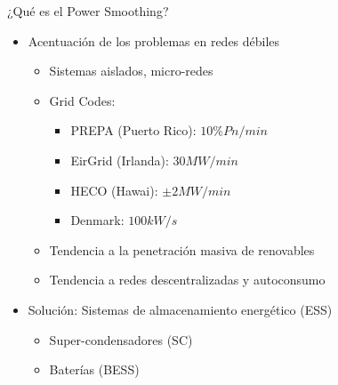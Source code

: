 \begin{frame}{¿Qué es el Power Smoothing?}
\begin{itemize}
    \item Acentuación de los problemas en redes débiles\\[1ex]
    \begin{itemize}
        \item Sistemas aislados, micro-redes \\[1ex]
        \item Grid Codes:
        \begin{itemize}
            \item PREPA (Puerto Rico): $10\% Pn/min$
            \item EirGrid (Irlanda): $30 MW/min$
            \item HECO (Hawai): $\pm2 MW/min$
            \item Denmark: $100 kW/s$ \\[1ex]
        \end{itemize}
        \item Tendencia a la penetración masiva de renovables \\[1ex]
        \item Tendencia a redes descentralizadas y autoconsumo \\[2ex]
    \end{itemize}{}
    \item Solución: Sistemas de almacenamiento energético (ESS)
    \begin{itemize}
        \item Super-condensadores  (SC)\\[1ex]
        \item Baterías (BESS)\\[1ex]
    \end{itemize}
\end{itemize}
\end{frame}
%
%

